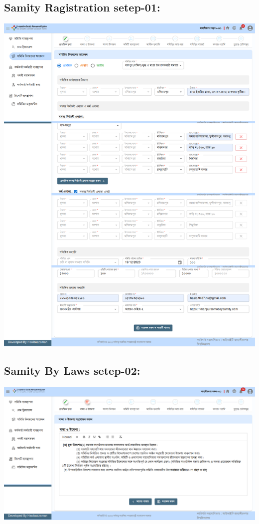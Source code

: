 \subsection{Samity Ragistration setep-01:}
  \includegraphics[width=14cm]{Chap4/6.png}

\subsection{Samity By Laws setep-02:}
  \includegraphics[width=14cm]{Chap4/step2.png}

